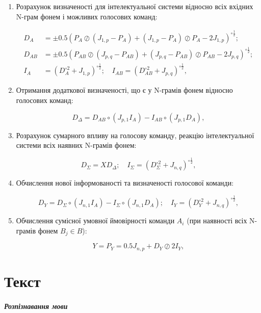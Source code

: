 \begin{enumerate}
	\setlength{\leftskip}{-3em}\cyrillicfontsf
	\item Розрахунок визначеності для інтелектуальної системи відносно всіх вхідних N-грам фонем і можливих голосових команд:
	
	\begin{align}
		D_A&=\pm0.5(P_{A}\oslash(J_{1,p}-P_{A}) + (J_{1,p}-P_{A})\oslash P_{A} -2J_{1,p})^{\circ \frac{1}{2}}; \nonumber \\
		D_{AB}&=\pm0.5(P_{AB}\oslash(J_{p,q}-P_{AB}) + (J_{p,q}-P_{AB})\oslash P_{AB}-2J_{p,q})^{\circ \frac{1}{2}}; \nonumber \\
		I_A&=(D_A^{\circ 2}+J_{1,p})^{\circ \frac{1}{2}};\quad I_{AB}=(D_{AB}^{\circ 2}+J_{p,q})^{\circ \frac{1}{2}}, \nonumber
	\end{align}
	
	\item Отримання додаткової визначеності, що є у N-грамів фонем відносно голосових команд:
	
	\[
	D_\Delta=D_{AB} \circ (J_{p,1}I_A)-I_{AB} \circ (J_{p,1}D_A),
	\]
	
	\item Розрахунок сумарного впливу на голосову команду, реакцію інтелектуальної системи всіх наявних N-грамів фонем:
	
	\[
	D_\Sigma = XD_\Delta;\quad I_\Sigma=(D_\Sigma^{\circ 2}+J_{n,q})^{\circ \frac{1}{2}},
	\]
	
	\item Обчислення нової інформованості та визначеності голосової команди:
	
	\[
	D_Y=D_\Sigma \circ (J_{n,1}I_A) - I_\Sigma \circ (J_{n,1}D_A);\quad I_Y=(D_Y^{\circ 2}+J_{n,q})^{\circ \frac{1}{2}},
	\]
	
	\item Обчислення сумісної умовної ймовірності команди $A_i$ (при наявності всіх N-грамів фонем $B_j \in B$):
	
	\[
	Y=P_Y=0.5J_{n,p}+D_Y \oslash 2I_Y,
	\]
	
\end{enumerate}

\chapter{Текст}

\paragraph{Розпізнавання мови}

